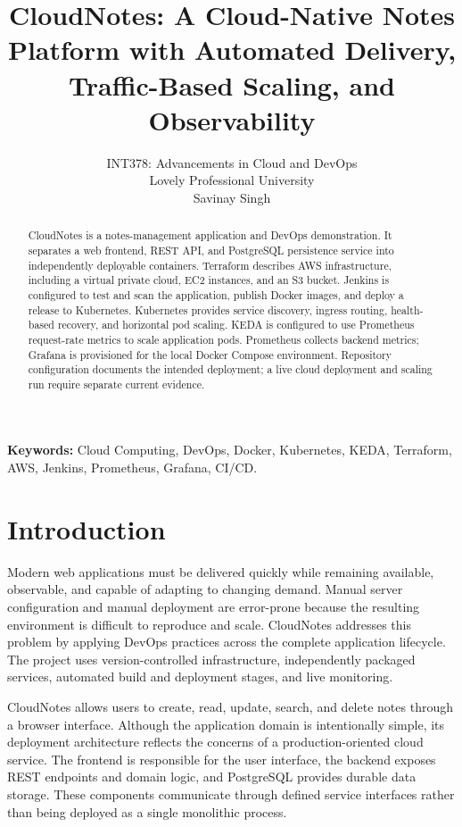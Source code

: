 \documentclass[12pt,a4paper]{article}
\begin{document}
\title{CloudNotes: A Cloud-Native Notes Platform with Automated Delivery, Traffic-Based Scaling, and Observability}
\author{INT378: Advancements in Cloud and DevOps\\Lovely Professional University\\Savinay Singh}
\date{}
\maketitle

\begin{abstract}
CloudNotes is a notes-management application and DevOps demonstration. It separates a web frontend, REST API, and PostgreSQL persistence service into independently deployable containers. Terraform describes AWS infrastructure, including a virtual private cloud, EC2 instances, and an S3 bucket. Jenkins is configured to test and scan the application, publish Docker images, and deploy a release to Kubernetes. Kubernetes provides service discovery, ingress routing, health-based recovery, and horizontal pod scaling. KEDA is configured to use Prometheus request-rate metrics to scale application pods. Prometheus collects backend metrics; Grafana is provisioned for the local Docker Compose environment. Repository configuration documents the intended deployment; a live cloud deployment and scaling run require separate current evidence.
\end{abstract}

\noindent\textbf{Keywords:} Cloud Computing, DevOps, Docker, Kubernetes, KEDA, Terraform, AWS, Jenkins, Prometheus, Grafana, CI/CD.

\section{Introduction}
Modern web applications must be delivered quickly while remaining available, observable, and capable of adapting to changing demand. Manual server configuration and manual deployment are error-prone because the resulting environment is difficult to reproduce and scale. CloudNotes addresses this problem by applying DevOps practices across the complete application lifecycle. The project uses version-controlled infrastructure, independently packaged services, automated build and deployment stages, and live monitoring.

CloudNotes allows users to create, read, update, search, and delete notes through a browser interface. Although the application domain is intentionally simple, its deployment architecture reflects the concerns of a production-oriented cloud service. The frontend is responsible for the user interface, the backend exposes REST endpoints and domain logic, and PostgreSQL provides durable data storage. These components communicate through defined service interfaces rather than being deployed as a single monolithic process.
\end{document}
